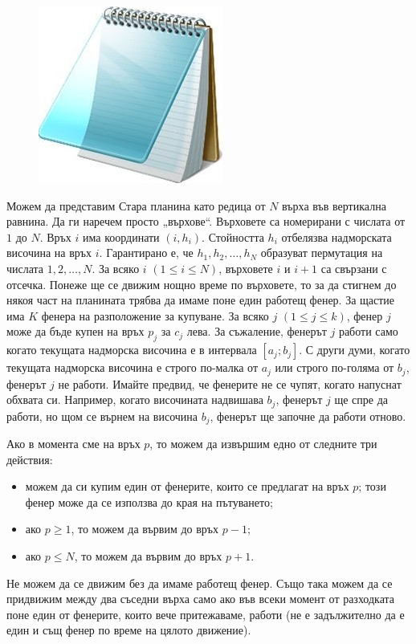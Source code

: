 \documentclass[12pt]{article}
\begin{document}
\renewcommand{\tl}{$3$ сек.}
\renewcommand{\ml}{$256$ MB}
\renewcommand{\header}{
	НАЦИОНАЛЕН ЕСЕНЕН ТУРНИР ПО ИНФОРМАТИКА\\
	София, 21 – 23 ноември 2025 г.\\
	Група A – 11, 12 клас
}

\begin{figure}
	\begin{adjustbox}{width=0.25\textwidth}
		\includegraphics{image}
	\end{adjustbox}
\end{figure}
Можем да представим Стара планина като редица от $N$ върха във вертикална равнина. Да ги наречем просто „върхове“. Върховете са номерирани с числата от $1$ до $N$. Връх $i$ има координати $(i, h_i)$. Стойността $h_i$ отбелязва надморската височина на връх $i$. Гарантирано е, че $h_1, h_2, \dots, h_ N$ образуват пермутация на числата $1, 2, \dots,  N$. За всяко $i$ $(1 \le i \le  N)$, върховете $i$ и $i+1$ са свързани с отсечка. Понеже ще се движим нощно време по върховете, то за да стигнем до някоя част на планината трябва да имаме поне един работещ фенер. За щастие има $K$ фенера на разположение за купуване. За всяко $j$ $(1 \le j \le k)$, фенер $j$ може да бъде купен на връх $p_j$ за $c_j$ лева. За съжаление, фенерът $j$ работи само когато текущата надморска височина е в интервала $[a_j; b_j]$. С други думи, когато текущата надморска височина е строго по-малка от $a_j$ или строго по-голяма от $b_j$, фенерът $j$ не работи. Имайте предвид, че фенерите не се чупят, когато напуснат обхвата си. Например, когато височината надвишава $b_j$, фенерът $j$ ще спре да работи, но щом се върнем на височина $b_j$, фенерът ще започне да работи отново.

Ако в момента сме на връх $p$, то можем да извършим едно от следните три действия:
\begin{itemize}
	\item можем да си купим един от фенерите, които се предлагат на връх $p$; този фенер може да се използва до края на пътуването;
	\item ако $p \ge 1$, то можем да вървим до връх $p-1$;
	\item ако $p \le  N$, то можем да вървим до връх $p+1$.
\end{itemize}
Не можем да се движим без да имаме работещ фенер. Също така можем да се придвижим между два съседни върха само ако във всеки момент от разходката поне един от фенерите, които вече притежаваме, работи (не е задължително да е един и същ фенер по време на цялото движение).
\end{document}

